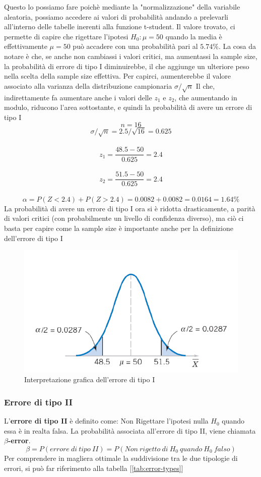 Questo lo possiamo fare poichè mediante la "normalizzazione" della variabile aleatoria, possiamo accedere ai valori di probabilità andando a prelevarli all'interno delle tabelle inerenti alla funzione t-student.
Il valore trovato, ci permette di capire che rigettare l'ipotesi \(H_0: \mu=50\) quando la media è effettivamente \(\mu=50\) può accadere con una probabilità pari al \(5.74\%\).
La cosa da notare è che, se anche non cambiassi i valori critici, ma aumentassi la sample size, la probabilità di errore di tipo I diminuirebbe, il che aggiunge un ulteriore peso nella scelta della sample size effettiva.
Per capirci, aumenterebbe il valore associato alla varianza della distribuzione campionaria \(\sigma/\sqrt{n}\) Il che, indirettamente fa aumentare anche i valori delle \(z_1\) e \(z_2\), che aumentando in modulo, riducono l'area sottostante, e quindi la probabilità di avere un errore di tipo I
\[n = 16\]
\[\sigma/\sqrt{n} = 2.5/\sqrt{16} = 0.625\]
\\
\[z_1 = \frac{48.5 - 50}{0.625} = 2.4\]
\\
\[z_2 = \frac{51.5-50}{0.625} = 2.4\]
\\
\[\alpha = P(Z < 2.4) + P(Z > 2.4) = 0.0082 + 0.0082 = 0.0164 = 1.64\%\]
La probabilità di avere un errore di tipo I ora si è ridotta drasticamente, a parità di valori critici (con probabilmente un livello di confidenza diverso), ma ciò ci basta per capire come la sample size è importante anche per la definizione dell'errore di tipo I

\begin{figure}[h]
\centering
\includegraphics[width=.6\textwidth]{img/chapter-4/type_I_error.png}
\caption{Interpretazione grafica dell'errore di tipo I}\label{img:exercise-tipo-I}
\end{figure}

\subsubsection{Errore di tipo II}
L'\textbf{errore di tipo II} è definito come: Non Rigettare l'ipotesi nulla \(H_0\) quando essa è in realta falsa. La probabilità associata all'errore di tipo II, viene chiamata \textbf{\(\beta\)-error}.
\[
\beta = P(errore\ di\ tipo\ II) = P(Non\ rigetto\ di\ H_0\ quando\ H_0\ falso)
\]
Per comprendere in magliera ottimale la suddivisione tra le due tipologie di errori, si può far riferimento alla tabella [\ref{tab:error-types}]

